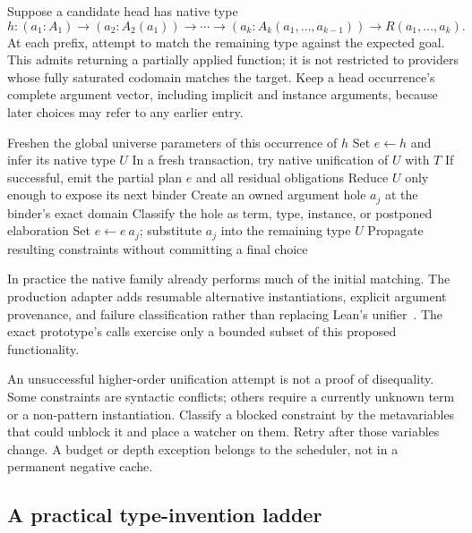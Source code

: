 Suppose a candidate head has native type
\[
 h:(a_1:A_1)\to(a_2:A_2(a_1))\to\cdots\to
 (a_k:A_k(a_1,\ldots,a_{k-1}))\to R(a_1,\ldots,a_k).
\]
At each prefix, attempt to match the remaining type against the expected goal. This admits returning a partially applied function; it is not restricted to providers whose fully saturated codomain matches the target. Keep a head occurrence's complete argument vector, including implicit and instance arguments, because later choices may refer to any earlier entry.

\begin{algorithm}[ht]
\caption{Demand-directed native application-spine search}
\label{alg:spine}
\begin{algorithmic}[1]
 \State Freshen the global universe parameters of this occurrence of $h$
 \State Set $e\gets h$ and infer its native type $U$
   \State In a fresh transaction, try native unification of $U$ with $T$
   \State If successful, emit the partial plan $e$ and all residual obligations
   \State Reduce $U$ only enough to expose its next binder
    \State \Return \EndIf
   \State Create an owned argument hole $a_j$ at the binder's exact domain
   \State Classify the hole as term, type, instance, or postponed elaboration
   \State Set $e\gets e\ a_j$; substitute $a_j$ into the remaining type $U$
   \State Propagate resulting constraints without committing a final choice
 \EndFor
\EndFunction
\end{algorithmic}
\end{algorithm}

In practice the native  family already performs much of the initial matching. The production adapter adds resumable alternative instantiations, explicit argument provenance, and failure classification rather than replacing Lean's unifier~\cite{lean-tactics}. The exact prototype's  calls exercise only a bounded subset of this proposed functionality.

An unsuccessful higher-order unification attempt is not a proof of disequality. Some constraints are syntactic conflicts; others require a currently unknown term or a non-pattern instantiation. Classify a blocked constraint by the metavariables that could unblock it and place a watcher on them. Retry after those variables change. A budget or depth exception belongs to the scheduler, not in a permanent negative cache.

\subsection{A practical type-invention ladder}

